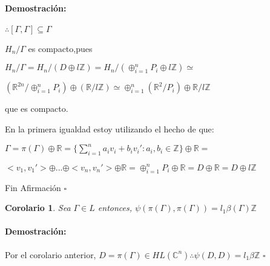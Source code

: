 \documentclass[12pt]{article}
\newtheorem{corollary}{Corolario}
\newenvironment{proof}{\paragraph{Demostración:}}{\hfill$\square$}
\begin{document}
\begin{proof}
$\therefore [\Gamma,\Gamma] \subseteq \Gamma$


$H_n / \Gamma$ es compacto,pues 

$H_n / \Gamma = H_n /( D \oplus l \mathbb{Z})=  H_n / (\oplus_{i=1}^n P_i \oplus l \mathbb{Z}) \simeq$

$(\mathbb{R}^{2n} / \oplus_{i=1}^n P_i) \oplus (\mathbb{R} / l \mathbb{Z}) \simeq \oplus_{i=1}^n(\mathbb{R}^2/P_i) \oplus \mathbb{R}/ l \mathbb{Z}$ 

 que es compacto.
 
 En la primera igualdad estoy utilizando el hecho de que:
 
 $\Gamma = \pi(\Gamma) \oplus \mathbb{R} =\{ \sum_{i=1}^n a_i v_i + b_i v_i': a_i,b_i \in \mathbb{Z} \} \oplus \mathbb{R}=$
 
 $<v_1,v_1'>\oplus ... \oplus <v_n,v_n'> \oplus \mathbb{R} = \oplus_{i=1}^n P_i \oplus \mathbb{R}= D\oplus \mathbb{R}= D \oplus l \mathbb{Z} $
 
Fin Afirmación
 \end{proof}

 \begin{corollary}
  Sea $\Gamma  \in L$ entonces, $\psi(\pi(\Gamma),\pi(\Gamma))=l_1 \beta(\Gamma) \mathbb{Z}$  
 \end{corollary}
 \begin{proof}
  Por el corolario anterior, $D=\pi(\Gamma) \in HL(\mathbb{C}^n) \therefore \psi(D,D)=l_1 \beta \mathbb{Z}$  
 \end{proof}
\end{document}
